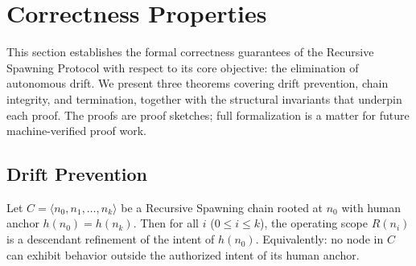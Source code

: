 \section{Correctness Properties}
\label{sec:rs-correctness}

This section establishes the formal correctness guarantees of the Recursive Spawning Protocol with respect to its core objective: the elimination of autonomous drift. We present three theorems covering drift prevention, chain integrity, and termination, together with the structural invariants that underpin each proof. The proofs are proof sketches; full formalization is a matter for future machine-verified proof work.

\subsection{Drift Prevention}
\label{sec:rs-drift-prevention}

\begin{thrm}
\label{thrm:drift-prevention}
Let $C = \langle n_0, n_1, \ldots, n_k \rangle$ be a Recursive Spawning chain rooted at $n_0$ with human anchor $h(n_0) = h(n_k)$. Then for all $i$ ($0 \leq i \leq k$), the operating scope $R(n_i)$ is a descendant refinement of the intent of $h(n_0)$. Equivalently: no node in $C$ can exhibit behavior outside the authorized intent of its human anchor.
\end{thrm}

